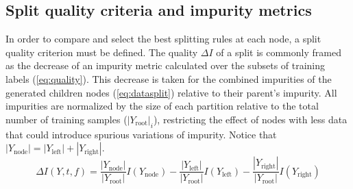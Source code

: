 %


\subsection{Split quality criteria and impurity metrics}
\label{sec:criteria}

In order to compare and select the best splitting rules at each node, a split quality criterion must be defined. The quality $\Delta I$ of a split is commonly framed as the decrease of an impurity metric calculated over the subsets of training labels (\autoref{eq:quality}). This decrease is taken for the combined impurities of the generated children nodes (\autoref{eq:datasplit}) relative to their parent's impurity. All impurities are normalized by the size of each partition relative to the total number of training samples ($|Y_\text{root}|_i$), restricting the effect of nodes with less data that could introduce spurious variations of impurity. Notice that $|Y_\text{node}|=|Y_\text{left}|+|Y_\text{right}|$.
%
\begin{equation}
    \Delta I(Y, t, f) =
        \frac{|Y_\text{node}|}{|Y_\text{root}|} I(Y_\text{node})
        - \frac{|Y_\text{left}|}{|Y_\text{root}|} I(Y_\text{left})
        - \frac{|Y_\text{right}|}{|Y_\text{root}|} I(Y_\text{right})
    \label{eq:quality}
\end{equation}

